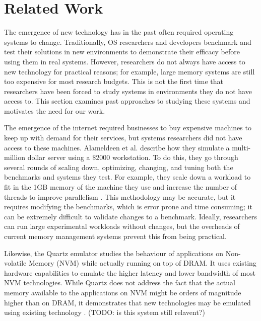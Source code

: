 \documentclass[twocolumn,11pt]{article}
\begin{document}
\section{Related Work}

The emergence of new technology has in the past often required operating systems
to change. Traditionally, OS researchers and developers benchmark and test their
solutions in new environments to demonstrate their efficacy before using them in
real systems. However, researchers do not always have access to new technology
for practical reasons; for example, large memory systems are still too expensive
for most research budgets. This is not the first time that researchers have been
forced to study systems in environments they do not have access to. This section
examines past approaches to studying these systems and motivates the need for
our work.

The emergence of the internet required businesses to buy expensive machines to
keep up with demand for their services, but systems researchers did not have
access to these machines. Alameldeen et al. describe how they simulate a
multi-million dollar server using a \$2000 workstation. To do this, they go
through several rounds of scaling down, optimizing, changing, and tuning both
the benchmarks and systems they test. For example, they scale down a workload to
fit in the 1GB memory of the machine they use and increase the number of threads
to improve parallelism \cite{2kmachine}. This methodology may be accurate, but
it requires modifying the benchmarks, which is error prone and time consuming;
it can be extremely difficult to validate changes to a benchmark. Ideally,
researchers can run large experimental workloads without changes, but the overheads
of current memory management systems prevent this from being practical.

Likewise, the Quartz emulator studies the behaviour of applications on
Non-volatile Memory (NVM) while actually running on top of DRAM. It uses
existing hardware capabilities to emulate the higher latency and lower bandwidth
of most NVM technologies. While Quartz does not address the fact that the actual
memory available to the applications on NVM might be orders of magnitude higher
than on DRAM, it demonstrates that new technologies may be emulated using
existing technology \cite{quartz}. (TODO: is this system still relavent?)
\end{document}
